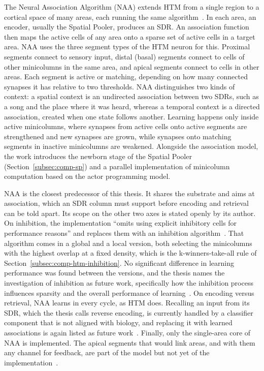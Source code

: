 The Neural Association Algorithm (NAA) extends HTM from a single region to a
cortical space of many areas, each running the same
algorithm~\cite{dobric2024naa}. In each area, an encoder, usually the Spatial
Pooler, produces an SDR. An association function then maps the active cells of
any area onto a sparse set of active cells in a target area. NAA uses the
three segment types of the HTM neuron for this. Proximal segments connect to
sensory input, distal (basal) segments connect to cells of other minicolumns
in the same area, and apical segments connect to cells in other areas. Each
segment is active or matching, depending on how many connected synapses it has
relative to two thresholds. NAA distinguishes two kinds of context: a spatial
context is an undirected association between two SDRs, such as a song and the
place where it was heard, whereas a temporal context is a directed
association, created when one state follows another. Learning happens only
inside active minicolumns, where synapses from active cells onto active
segments are strengthened and new synapses are grown, while synapses onto
matching segments in inactive minicolumns are weakened. Alongside the
association model, the work introduces the newborn stage of the Spatial Pooler
(Section~\ref{subsec:comp-sp}) and a parallel implementation of minicolumn
computation based on the actor programming model.

NAA is the closest predecessor of this thesis. It shares the substrate and aims
at association, which an SDR column must support before encoding and retrieval
can be told apart. Its scope on the other two axes is stated openly by its
author. On inhibition, the implementation ``omits using explicit inhibitory
cells for performance reasons'' and replaces them with an inhibition
algorithm~\cite[Sec.~5.7.3]{dobric2024naa}. That algorithm comes in a global and
a local version, both selecting the minicolumns with the highest overlap at a
fixed density, which is the k-winners-take-all rule of
Section~\ref{subsec:comp-htm-inhibition}. No significant difference in learning
performance was found between the versions, and the thesis names the
investigation of inhibition as future work, specifically how the inhibition
process influences sparsity and the overall performance of
learning~\cite[Sec.~9.5.1.7]{dobric2024naa}. On encoding versus retrieval, NAA
learns in every cycle, as HTM does. Recalling an input from its SDR, which the
thesis calls reverse encoding, is currently handled by a classifier component
that is not aligned with biology, and replacing it with learned associations is
again listed as future work~\cite[Sec.~9.5.1.2]{dobric2024naa}. Finally, only
the single-area core of NAA is implemented. The apical segments that would link
areas, and with them any channel for feedback, are part of the model but not
yet of the implementation~\cite[Sec.~9.5.1.1]{dobric2024naa}.


